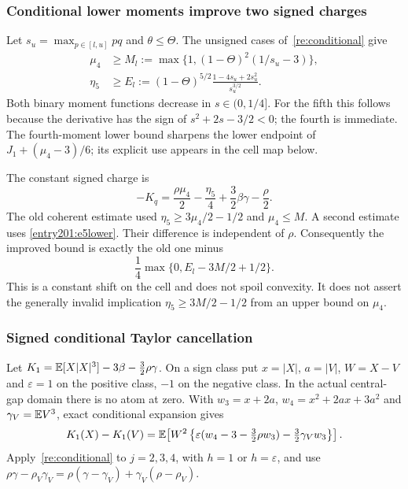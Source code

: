 \subsubsection{Conditional lower moments improve two signed charges}

Let $s_u=\max_{p\in[l,u]}pq$ and $\theta\le\Theta$.
The unsigned cases of~\eqref{re:conditional} give
\begin{align}
 \mu_4&\ge M_l:=\max\{1,(1-\Theta)^2(1/s_u-3)\},\label{entry201:m4lower}\\
 \eta_5&\ge E_l:=
 (1-\Theta)^{5/2}\frac{1-4s_u+2s_u^2}{s_u^{3/2}}.\label{entry201:e5lower}
\end{align}
Both binary moment functions decrease in $s\in(0,1/4]$.
For the fifth this follows because the derivative has the sign of
$s^2+2s-3/2<0$; the fourth is immediate.
The fourth-moment lower bound sharpens the lower endpoint of
$J_1+(\mu_4-3)/6$; its explicit use appears in the cell map below.

The constant signed charge is
\[
 -K_q=\frac{\rho\mu_4}{2}-\frac{\eta_5}{4}
       +\frac32\beta\gamma-\frac{\rho}{2}.
\]
The old coherent estimate used $\eta_5\ge3\mu_4/2-1/2$ and
$\mu_4\le M$. A second estimate uses \eqref{entry201:e5lower}.
Their difference is independent of $\rho$. Consequently the improved
bound is exactly the old one minus
\begin{equation}\label{entry201:eta-improvement}
 \frac14\max\{0,E_l-3M/2+1/2\}.
\end{equation}
This is a constant shift on the cell and does not spoil convexity.
It does not assert the generally invalid implication
$\eta_5\ge3M/2-1/2$ from an upper bound on $\mu_4$.

\subsubsection{Signed conditional Taylor cancellation}

Let $K_1=\mathbb E[X|X|^3]-3\beta-\tfrac32\rho\gamma$.
On a sign class put $x=|X|$, $a=|V|$, $W=X-V$ and
$\varepsilon=1$ on the positive class, $-1$ on the negative class.
In the actual central-gap domain there is no atom at zero.
With $w_3=x+2a$, $w_4=x^2+2ax+3a^2$ and
$\gamma_V=\mathbb E V^3$, exact conditional expansion gives
\begin{equation}\label{entry201:Kexact}
 K_1(X)-K_1(V)
 =\mathbb E\!\left[W^2
 \left\{\varepsilon(w_4-3-\tfrac32\rho w_3)
                   -\tfrac32\gamma_Vw_3\right\}\right].
\end{equation}
Apply~\eqref{re:conditional} to $j=2,3,4$, with $h=1$
or $h=\varepsilon$, and use
$\rho\gamma-\rho_V\gamma_V
=\rho(\gamma-\gamma_V)+\gamma_V(\rho-\rho_V)$.

